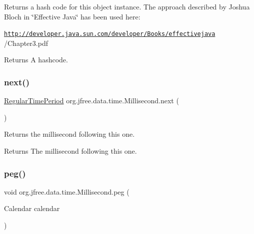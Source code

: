 Returns a hash code for this object instance. The approach described by Joshua Bloch in \char`\"{}\+Effective Java\char`\"{} has been used here\+: 

{\ttfamily \href{http://developer.java.sun.com/developer/Books/effectivejava}{\tt http\+://developer.\+java.\+sun.\+com/developer/\+Books/effectivejava} /\+Chapter3.pdf}

\begin{DoxyReturn}{Returns}
A hashcode. 
\end{DoxyReturn}
\mbox{\label{classorg_1_1jfree_1_1data_1_1time_1_1_millisecond_ac88167e68af60951f52188df2dc69ccb}} 
\subsubsection{\texorpdfstring{next()}{next()}}
{\footnotesize\ttfamily \mbox{\hyperlink{classorg_1_1jfree_1_1data_1_1time_1_1_regular_time_period}{Regular\+Time\+Period}} org.\+jfree.\+data.\+time.\+Millisecond.\+next (\begin{DoxyParamCaption}{ }\end{DoxyParamCaption})}

Returns the millisecond following this one.

\begin{DoxyReturn}{Returns}
The millisecond following this one. 
\end{DoxyReturn}
\mbox{\label{classorg_1_1jfree_1_1data_1_1time_1_1_millisecond_ae9a69e2252d3319a76b4592798b9b1aa}} 
\subsubsection{\texorpdfstring{peg()}{peg()}}
{\footnotesize\ttfamily void org.\+jfree.\+data.\+time.\+Millisecond.\+peg (\begin{DoxyParamCaption}\item[{Calendar}]{calendar }\end{DoxyParamCaption})}

